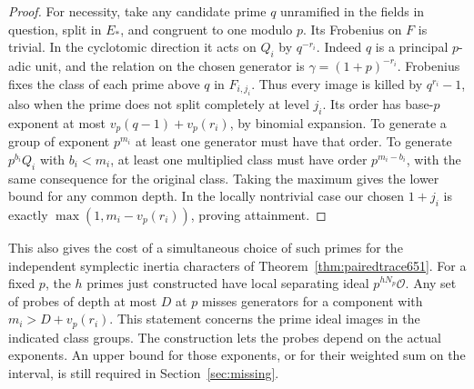 \documentclass[a4paper,11pt]{article}
\theoremstyle{definition}
\theoremstyle{remark}
\numberwithin{equation}{section}
\begin{document}
\begin{proof}
For necessity, take any candidate prime \(q\) unramified
in the fields in question, split in \(E_*\), and congruent
to one modulo \(p\). Its Frobenius on \(F\) is trivial.
In the cyclotomic direction it acts on \(Q_i\) by \(q^{-r_i}\).
Indeed \(q\) is a principal \(p\)-adic unit, and the
relation on the chosen generator is
\(\gamma=(1+p)^{-r_i}\). Frobenius fixes the class of
each prime above \(q\) in \(F_{i,j_i}\). Thus every image
is killed by \(q^{r_i}-1\), also when the prime does not
split completely at level \(j_i\). Its order has
base-\(p\) exponent at most \(v_p(q-1)+v_p(r_i)\), by
binomial expansion. To generate a group of exponent
\(p^{m_i}\) at least one generator must have that order.
To generate \(p^{b_i}Q_i\) with \(b_i<m_i\), at least one
multiplied class must have order \(p^{m_i-b_i}\), with
the same consequence for the original class. Taking the
maximum gives the lower bound for any common depth. In
the locally nontrivial case our chosen \(1+j_i\) is
exactly \(\max(1,m_i-v_p(r_i))\), proving attainment.
\end{proof}

This also gives the cost of a simultaneous choice of such
primes for the independent symplectic inertia characters of
Theorem~\ref{thm:pairedtrace651}. For a fixed \(p\), the \(h\)
primes just constructed have local separating ideal
\(p^{hN_p}\mathcal O\). Any set of probes of depth at most
\(D\) at \(p\) misses generators for a component with
\(m_i>D+v_p(r_i)\). This statement concerns the prime ideal
images in the indicated class groups. The construction lets
the probes depend on the actual exponents. An upper bound for
those exponents, or for their weighted sum on the interval,
is still required in Section~\ref{sec:missing}.

\clearpage
\end{document}
